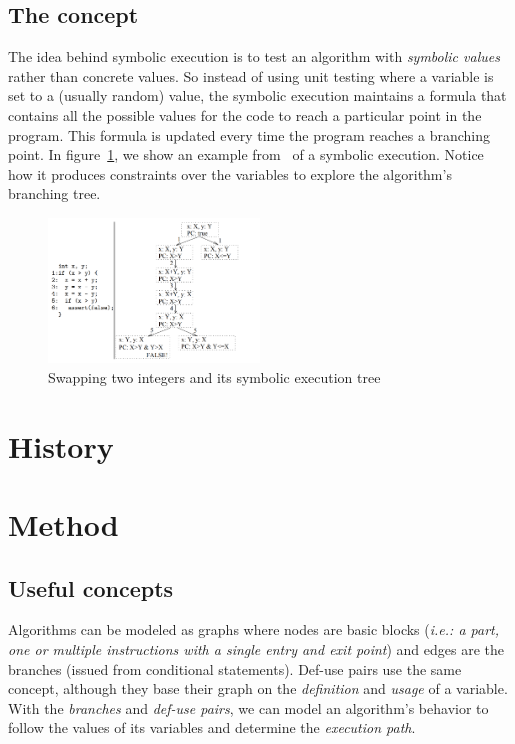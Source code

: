 \documentclass[11pt]{article}
\begin{document}
    \subsection{The concept}
      The idea behind symbolic execution is to test an algorithm with \emph{symbolic values} rather than concrete values. So instead of using unit testing where a variable is set to a (usually random) value, the symbolic execution maintains a formula that contains all the possible values for the code to reach a particular point in the program. This formula is updated every time the program reaches a branching point. In figure~\ref{fig:symbolicsimple}, we show an example from~\cite{visserWillemCorina} of a symbolic execution. Notice how it produces constraints over the variables to explore the algorithm's branching tree.
      \begin{figure}
        \includegraphics[width=0.5\textwidth]{symbolicsimple}
        \caption{Swapping two integers and its symbolic execution tree}
        \label{fig:symbolicsimple}
      \end{figure}

  \section{History}

  \section{Method}
    \subsection{Useful concepts}
      Algorithms can be modeled as graphs where nodes are basic blocks (\emph{i.e.: a part, one or multiple instructions with a single entry and exit point}) and edges are the branches (issued from conditional statements). Def-use pairs use the same concept, although they base their graph on the \emph{definition} and \emph{usage} of a variable. With the \emph{branches} and \emph{def-use pairs}, we can model an algorithm's behavior to follow the values of its variables and determine the \emph{execution path}.
\end{document}
